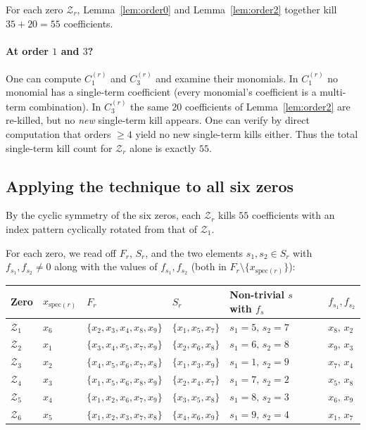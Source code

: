 \documentclass[11pt]{article}
\newcommand{\Z}{\mathcal{Z}}
\newcommand{\spec}{\mathrm{spec}}
\theoremstyle{definition}
\begin{document}
For each zero $\Z_r$, Lemma~\ref{lem:order0} and Lemma~\ref{lem:order2}
together kill $35+20=55$ coefficients.

\paragraph{At order $1$ and $3$?} One can compute $C_1^{(r)}$ and $C_3^{(r)}$
and examine their monomials. In $C_1^{(r)}$ no monomial has a single-term
coefficient (every monomial's coefficient is a multi-term combination).
In $C_3^{(r)}$ the same $20$ coefficients of Lemma~\ref{lem:order2} are
re-killed, but no \emph{new} single-term kill appears. One can verify by direct
computation that orders $\ge 4$ yield no new single-term kills either.
Thus the total single-term kill count for $\Z_r$ alone is exactly $55$.

\subsection{Applying the technique to all six zeros}

By the cyclic symmetry of the six zeros, each $\Z_r$ kills $55$ coefficients
with an index pattern cyclically rotated from that of $\Z_1$.

For each zero, we read off $F_r$, $S_r$, and the two elements $s_1,s_2\in S_r$
with $f_{s_1},f_{s_2}\neq 0$ along with the values of $f_{s_1},f_{s_2}$
(both in $F_r\setminus\{x_{\spec(r)}\}$):
\begin{center}
\begin{tabular}{llllll}
\toprule
Zero & $x_{\spec(r)}$ & $F_r$ & $S_r$ & Non-trivial $s$ with $f_s$ & $f_{s_1},f_{s_2}$ \\
\midrule
$\Z_1$ & $x_6$ & $\{x_2,x_3,x_4,x_8,x_9\}$ & $\{x_1,x_5,x_7\}$ & $s_1=5,\,s_2=7$ & $x_8,\,x_2$ \\
$\Z_2$ & $x_1$ & $\{x_3,x_4,x_5,x_7,x_9\}$ & $\{x_2,x_6,x_8\}$ & $s_1=6,\,s_2=8$ & $x_9,\,x_3$ \\
$\Z_3$ & $x_2$ & $\{x_4,x_5,x_6,x_7,x_8\}$ & $\{x_1,x_3,x_9\}$ & $s_1=1,\,s_2=9$ & $x_7,\,x_4$ \\
$\Z_4$ & $x_3$ & $\{x_1,x_5,x_6,x_8,x_9\}$ & $\{x_2,x_4,x_7\}$ & $s_1=7,\,s_2=2$ & $x_5,\,x_8$ \\
$\Z_5$ & $x_4$ & $\{x_1,x_2,x_6,x_7,x_9\}$ & $\{x_3,x_5,x_8\}$ & $s_1=8,\,s_2=3$ & $x_6,\,x_9$ \\
$\Z_6$ & $x_5$ & $\{x_1,x_2,x_3,x_7,x_8\}$ & $\{x_4,x_6,x_9\}$ & $s_1=9,\,s_2=4$ & $x_1,\,x_7$ \\
\bottomrule
\end{tabular}
\end{center}
\end{document}
